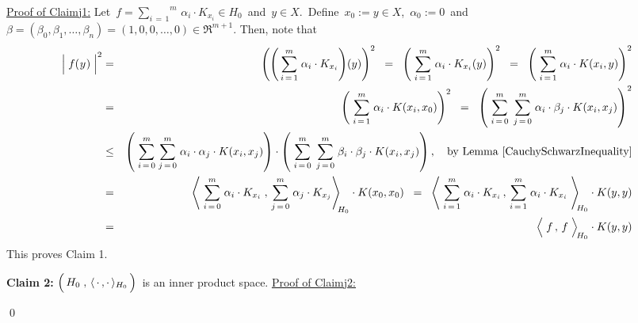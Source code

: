 \underline{Proof of Claim{\color{white}j}1:}\quad
Let
\,$f = \overset{m}{\underset{i\,=\,1}{\sum}}\, \alpha_{i} \cdot K_{x_{i}} \in H_{0}$\,
and
\,$y \in X$.\,
Define \,$x_{0} := y \in X$,\, $\alpha_{0} := 0$\, and
\,$\beta = (\beta_{0},\beta_{1},\ldots,\beta_{n}) = (1,0,0,\ldots,0) \in \Re^{m+1}$.
Then, note that
\begin{eqnarray*}
\left\vert\;f(\overset{{\color{white}-}}{y})\;\right\vert^{2}
& = &
	\left(
		\left(\,\overset{m}{\underset{i\,=\,1}{\sum}}\; \alpha_{i} \cdot K_{x_{i}}\right)\!(y)
		\right)^{2}
\;\; = \;\;
	\left(\;
		\overset{m}{\underset{i\,=\,1}{\sum}}\; \alpha_{i} \cdot K_{x_{i}}(y)
		\right)^{2}
\;\; = \;\;
	\left(\;
		\overset{m}{\underset{i\,=\,1}{\sum}}\; \alpha_{i} \cdot K(x_{i},y)
		\right)^{2}
\\
& = &
	\left(\;
		\overset{m}{\underset{i\,=\,1}{\sum}}\; \alpha_{i} \cdot K(x_{i},x_{0})
		\right)^{2}
\;\; = \;\;
	\left(\;
		\overset{m}{\underset{i\,=\,0}{\sum}}\;\,
		\overset{m}{\underset{j\,=\,0}{\sum}}\;
		\alpha_{i} \cdot \beta_{j} \cdot K(x_{i},x_{j})
		\right)^{2}
\\
& \leq &
	\left(\;
		\overset{m}{\underset{i\,=\,0}{\sum}}\;
		\overset{m}{\underset{j\,=\,0}{\sum}}\;
		\alpha_{i} \cdot \alpha_{j} \cdot K(x_{i},x_{j})
		\right)
	\cdot
	\left(\;
		\overset{m}{\underset{i\,=\,0}{\sum}}\;\,
		\overset{m}{\underset{j\,=\,0}{\sum}}\;
		\beta_{i} \cdot \beta_{j} \cdot K(x_{i},x_{j})
		\right),
	\quad
	\textnormal{by Lemma \ref{CauchySchwarzInequality}}
\\
& = &
	\left\langle\;
		\overset{m}{\underset{i\,=\,0}{\sum}}\; \alpha_{i} \cdot K_{x_{i}}
		\;,\,
		\overset{m}{\underset{j\,=\,0}{\sum}}\; \alpha_{j} \cdot K_{x_{j}}
		\right\rangle_{\!\!H_{0}}
	\cdot
	K(x_{0},x_{0})
\;\; = \;\;
	\left\langle\;
		\overset{m}{\underset{i\,=\,1}{\sum}}\; \alpha_{i} \cdot K_{x_{i}}
		\,,\,
		\overset{m}{\underset{i\,=\,1}{\sum}}\; \alpha_{i} \cdot K_{x_{i}}
		\;\right\rangle_{\!\!H_{0}}
	\cdot
	K(y,y)
\\
& = &
	\left\langle\; \overset{{\color{white}.}}{f} \,,\, f \;\right\rangle_{\!H_{0}}
	\cdot
	K(y,y)
\end{eqnarray*}
This proves Claim 1.

\vskip 0.5cm
\noindent
\textbf{Claim 2:}\quad
$\left(\,\overset{{\color{white}.}}{H_{0}}\;,\,\langle\,\cdot\,,\cdot\,\rangle_{H_{0}}\,\right)$\,
is an inner product space.
\vskip 0.2cm
\noindent
\underline{Proof of Claim{\color{white}j}2:}\quad

\qed


\renewcommand{\theenumi}{\roman{enumi}}
\renewcommand{\labelenumi}{\textnormal{(\theenumi)}$\;\;$}

